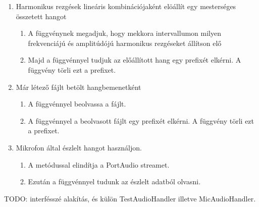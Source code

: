 \begin{enumerate}
	\item Harmonikus rezg\'esek line\'aris kombin\'aci\'ojak\'ent el\"o\'all\'it egy mesters\'eges \"osszetett hangot
		\begin{enumerate}
			\item A  f\"uggv\'enynek megadjuk, hogy mekkora intervallumon milyen frekvenci\'aj\'u \'es amplit\'ud\'oj\'u harmonikus rezg\'eseket \'all\'itson el\H o
			\item Majd a  f\"uggv\'ennyel tudjuk az el\H o\'all\'itott hang egy prefix\'et elk\'erni. A f\"uggv\'eny t\"orli ezt a prefixet.
		\end{enumerate}
	\item M\'ar l\'etez\H o  f\'ajlt bet\"olt hangbemenetk\'ent
		\begin{enumerate}
			\item A  f\"uggv\'ennyel beolvassa a f\'ajlt.
			\item A  f\"uggv\'ennyel a beolvasott f\'ajlt egy prefix\'et elk\'erni. A f\"uggv\'eny t\"orli ezt a prefixet.
		\end{enumerate}
	\item Mikrofon \'altal \'eszlelt hangot haszn\'aljon.
		\begin{enumerate}
			\item A  met\'odussal elind\'itja a PortAudio streamet.
			\item Ezut\'an a  f\"uggv\'ennyel tudunk az \'eszlelt adatb\'ol olvasni.
		\end{enumerate}
\end{enumerate} 

TODO: interf\'essz\'e alak\'it\'as, \'es k\"ul\"on TestAudioHandler illetve MicAudioHandler.

